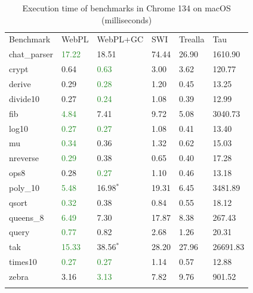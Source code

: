 \begin{table}[H]
\centering
{}
\begin{tabular}{llllll}
\addlinespace\hline\addlinespace
Benchmark & WebPL & WebPL+GC & SWI & Trealla & Tau \\
\addlinespace\hline\addlinespace
chat\_parser  & \textcolor{ForestGreen}{17.22}  &  18.51  &  74.44  &  26.90  &  1610.90  \\
crypt        &   0.64  &   \textcolor{ForestGreen}{0.63}  &   3.00  &   3.62  &   120.77  \\
derive       &   0.29  &   \textcolor{ForestGreen}{0.28}  &   1.20  &   0.45  &    13.25  \\
divide10     &   0.27  &   \textcolor{ForestGreen}{0.24}  &   1.08  &   0.39  &    12.99  \\
fib          &   \textcolor{ForestGreen}{4.84}  &   7.41  &   9.72  &   5.08  &  3040.73  \\
log10        &   \textcolor{ForestGreen}{0.27}  &   \textcolor{ForestGreen}{0.27}  &   1.08  &   0.41  &    13.40  \\
mu           &   \textcolor{ForestGreen}{0.34}  &   0.36  &   1.32  &   0.62  &    15.03  \\
nreverse     &   \textcolor{ForestGreen}{0.29}  &   0.38  &   0.65  &   0.40  &    17.28  \\
ops8         &   0.28  &   \textcolor{ForestGreen}{0.27}  &   1.10  &   0.46  &    13.18  \\
poly\_10      &   \textcolor{ForestGreen}{5.48}  &  16.98$^*$  &  19.31  &   6.45  &  3481.89  \\
qsort        &   \textcolor{ForestGreen}{0.32}  &   0.38  &   0.84  &   0.55  &    18.12  \\
queens\_8     &   \textcolor{ForestGreen}{6.49}  &   7.30  &  17.87  &   8.38  &   267.43  \\
query        &  \textcolor{ForestGreen}{0.77}  &   0.82  &   2.68  &   1.26  &    20.31  \\
tak          &  \textcolor{ForestGreen}{15.33}  &  38.56$^*$  &  28.20  &  27.96  & 26691.83  \\
times10      &   \textcolor{ForestGreen}{0.27}  &   \textcolor{ForestGreen}{0.27}  &   1.14  &   0.57  &    12.88  \\
zebra        &   3.16  &   \textcolor{ForestGreen}{3.13}  &   7.82  &   9.76  &   901.52  \\
\addlinespace\hline\addlinespace
\end{tabular}
\caption{Execution time of benchmarks in Chrome 134 on macOS (milliseconds)}
\label{tab:chrome-time}
\end{table}


